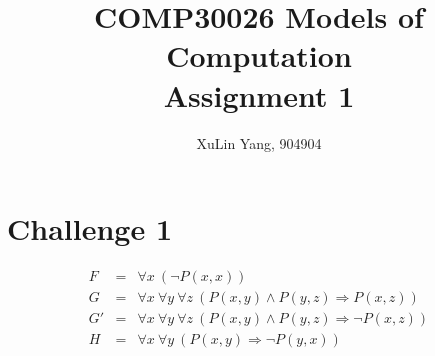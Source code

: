 \documentclass[11pt]{article}
\newcommand{\impl}{\mathbin{\Rightarrow}}
\begin{document}
\author{XuLin Yang, 904904}
\title{COMP30026 Models of Computation \\ Assignment 1}
\maketitle

\medskip

\section*{Challenge 1}
\[
\begin{array}{lll}
   F & = & \forall x\ (\neg P(x,x))
\\ G & = &
    \forall x\ \forall y\ \forall z\ (P(x,y) \land P(y,z) \impl P(x,z))
\\ G' & = &
    \forall x\ \forall y\ \forall z\ (P(x,y) \land P(y,z) \impl \neg P(x,z))
\\ H & = & \forall x\ \forall y\ (P(x,y) \impl \neg P(y,x))
\end{array}
\]
\end{document}
